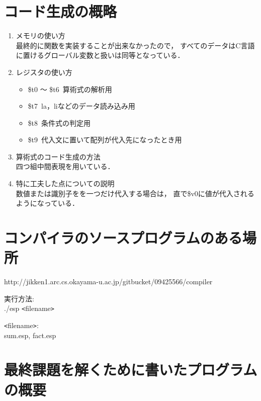 \documentclass[11pt,a4j]{jarticle}
\begin{document}

\section{コード生成の概略}

\begin{enumerate}
\item {メモリの使い方}\\
  最終的に関数を実装することが出来なかったので，
すべてのデータはC言語に置けるグローバル変数と扱いは同等となっている．
\item {レジスタの使い方}
  \begin{itemize}
  \item \$t0 ～ \$t6~算術式の解析用
  \item \$t7~la，liなどのデータ読み込み用
  \item \$t8~条件式の判定用
  \item \$t9~代入文に置いて配列が代入先になったとき用
  \end{itemize}
\item {算術式のコード生成の方法}\\
  四つ組中間表現を用いている．
\item {特に工夫した点についての説明}\\
  数値または識別子をを一つだけ代入する場合は，
  直で\$v0に値が代入されるようになっている．
\end{enumerate}




\section{コンパイラのソースプログラムのある場所}
http://jikken1.arc.cs.okayama-u.ac.jp/gitbucket/09425566/compiler

実行方法:\\
\hspace{24pt}./esp \verb|<|filename\verb|>|

\verb|<|filename\verb|>|:\\
\hspace{24pt} sum.esp, fact.esp\\



\section{最終課題を解くために書いたプログラムの概要}
\end{document}
